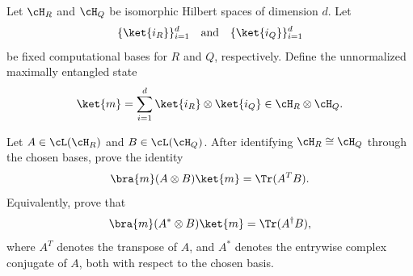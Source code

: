Let $\cH_R$ and $\cH_Q$ be isomorphic Hilbert spaces of dimension $d$. Let
$$
\{\ket{i_R}\}_{i=1}^{d}
\quad\text{and}\quad
\{\ket{i_Q}\}_{i=1}^{d}
$$
be fixed computational bases for $R$ and $Q$, respectively. Define the unnormalized maximally entangled state
$$
\ket{m}
=
\sum_{i=1}^{d}
\ket{i_R}\otimes \ket{i_Q}
\in \cH_R\otimes \cH_Q.
$$

Let $A\in \cL(\cH_R)$ and $B\in \cL(\cH_Q)$. After identifying $\cH_R\cong \cH_Q$ through the chosen bases, prove the identity
$$
\bra{m}(A\otimes B)\ket{m}
=
\Tr(A^T B).
$$
Equivalently, prove that
$$
\bra{m}(A^\ast\otimes B)\ket{m}
=
\Tr(A^\dagger B),
$$
where $A^T$ denotes the transpose of $A$, and $A^\ast$ denotes the entrywise complex conjugate of $A$, both with respect to the chosen basis.
